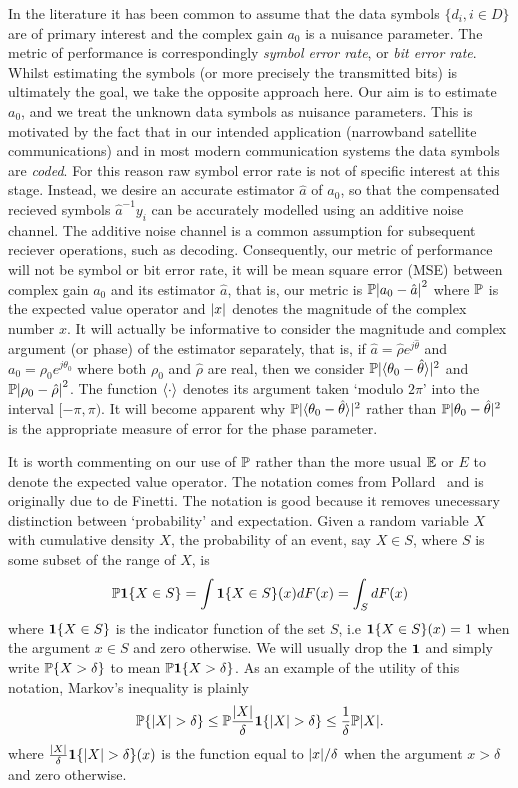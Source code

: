 \documentclass[a4paper,10pt]{article}
\begin{document}
In the literature it has been common to assume that the data symbols $\{d_i, i \in D\}$ are of primary interest and the complex gain $a_0$ is a nuisance parameter.  The metric of performance is correspondingly \emph{symbol error rate}, or \emph{bit error rate}.  Whilst estimating the symbols (or more precisely the transmitted bits) is ultimately the goal, we take the opposite approach here.  Our aim is to estimate $a_0$, and we treat the unknown data symbols as nuisance parameters.  This is motivated by the fact that in our intended application (narrowband satellite communications) and in most modern communication systems the data symbols are \emph{coded}.  For this reason raw symbol error rate is not of specific interest at this stage.  Instead, we desire an accurate estimator $\hat{a}$ of $a_0$, so that the compensated recieved symbols $\hat{a}^{-1}y_i$ can be accurately modelled using an additive noise channel.  The additive noise channel is a common assumption for subsequent reciever operations, such as decoding.  Consequently, our metric of performance will not be symbol or bit error rate, it will be mean square error (MSE) between complex gain $a_0$ and its estimator $\hat{a}$, that is, our metric is ${\mathbb P}{\left| a_0 - \hat{a} \right|}^2$ where ${\mathbb P}$ is the expected value operator and ${\left| x \right|}$ denotes the magnitude of the complex number $x$. It will actually be informative to consider the magnitude and complex argument (or phase) of the estimator separately, that is, if $\hat{a} = \hat{\rho}e^{j\hat{\theta}}$ and $a_0 = \rho_0e^{j\theta_0}$ where both $\rho_0$ and $\hat{\rho}$ are real, then we consider ${\mathbb P}\vert\langle\theta_0 - \hat{\theta}\rangle\vert^2$ and ${\mathbb P}{\left| \rho_0 - \hat{\rho} \right|}^2$.  The function $\left\langle \cdot \right\rangle$ denotes its argument taken `modulo $2\pi$' into the interval $[-\pi, \pi)$.  It will become apparent why ${\mathbb P}\vert\langle\theta_0 - \hat{\theta}\rangle\vert^2$ rather than ${\mathbb P}\vert\theta_0 - \hat{\theta}\vert^2$ is the appropriate measure of error for the phase parameter.

It is worth commenting on our use of ${\mathbb P}$ rather than the more usual ${\mathbb E}$ or $E$ to denote the expected value operator.  The notation comes from Pollard~\cite[Ch 1]{Pollard_users_guide_prob_2002} and is originally due to de Finetti.  The notation is good because it removes unecessary distinction between `probability' and expectation.  Given a random variable $X$ with cumulative density $X$, the probability of an event, say $X \in S$, where $S$ is some subset of the range of $X$, is 
\[
{\mathbb P} {\mathbf 1} \{X \in S\} = \int {\mathbf 1} \{X \in S\}(x) dF(x) = \int_{S} dF(x)
\]
where ${\mathbf 1} \{X \in S\}$ is the indicator function of the set $S$, i.e ${\mathbf 1} \{X \in S\}(x) = 1$ when the argument $x \in S$ and zero otherwise.  We will usually drop the $\boldsymbol{1}$ and simply write ${\mathbb P} \{ X > \delta \}$ to mean ${\mathbb P} \boldsymbol{1}\{ X > \delta \}$.  As an example of the utility of this notation, Markov's inequality is plainly 
\[
{\mathbb P} \{ {\left| X \right|} > \delta \}  \leq {\mathbb P} \frac{{\left| X \right|}}{\delta}\boldsymbol{1}\{ {\left| X \right|} > \delta \} \leq \frac{1}{\delta}{\mathbb P}{\left| X \right|}.
\]
where $\frac{{\left| X \right|}}{\delta}\boldsymbol{1}\{ {\left| X \right|} > \delta \}(x)$ is the function equal to ${\left| x \right|}/\delta$ when the argument $x > \delta$ and zero otherwise.
\end{document}
